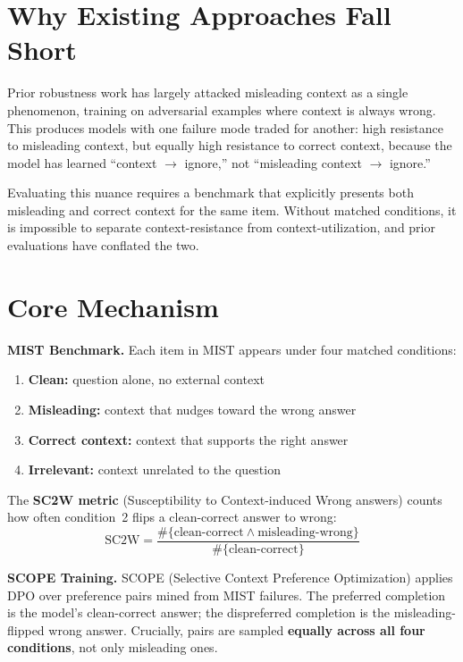 \documentclass[10pt,twocolumn]{article}
\begin{document}
\section{Why Existing Approaches Fall Short}

Prior robustness work has largely attacked misleading context as a single phenomenon,
training on adversarial examples where context is always wrong. This produces models
with one failure mode traded for another: high resistance to misleading context, but
equally high resistance to correct context, because the model has learned
``context $\to$ ignore,'' not ``misleading context $\to$ ignore.''

Evaluating this nuance requires a benchmark that explicitly presents both misleading
and correct context for the same item. Without matched conditions, it is impossible
to separate context-resistance from context-utilization, and prior evaluations have
conflated the two.

\section{Core Mechanism}

\textbf{MIST Benchmark.}
Each item in MIST appears under four matched conditions:
\begin{enumerate}[itemsep=2pt,parsep=0pt]
  \item \textbf{Clean:} question alone, no external context
  \item \textbf{Misleading:} context that nudges toward the wrong answer
  \item \textbf{Correct context:} context that supports the right answer
  \item \textbf{Irrelevant:} context unrelated to the question
\end{enumerate}

The \textbf{SC2W metric} (Susceptibility to Context-induced Wrong answers) counts
how often condition~2 flips a clean-correct answer to wrong:
\[
\mathrm{SC2W} = \frac{\#\{\text{clean-correct} \wedge \text{misleading-wrong}\}}{
  \#\{\text{clean-correct}\}}
\]

\textbf{SCOPE Training.}
SCOPE (Selective Context Preference Optimization) applies DPO over preference pairs
mined from MIST failures. The preferred completion is the model's clean-correct
answer; the dispreferred completion is the misleading-flipped wrong answer.
Crucially, pairs are sampled \textbf{equally across all four conditions},
not only misleading ones.
\end{document}
